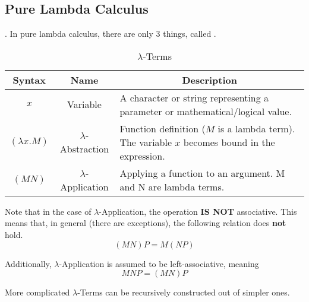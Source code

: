 \subsection{Pure Lambda Calculus}\label{subsec:Pure_Lambda_Calculus}.
In pure lambda calculus, there are only 3 things, called .

\begin{table}[h!tbp]
  \centering
  \begin{tabular}{ccp{15cm}}
    \toprule
    Syntax & Name & \multicolumn{1}{c}{Description} \\
    \midrule
    $x$ & Variable & A character or string representing a parameter or mathematical/logical value. \\
$ (\lambda x. M)$ & $\lambda$-Abstraction & Function definition ($M$ is a lambda term). The variable $x$ becomes bound in the expression. \\
    $(M N)$ & $\lambda$-Application & Applying a function to an argument. M and N are lambda terms. \\
    \bottomrule
  \end{tabular}
\caption{$\lambda$-Terms}
\label{tab:Lambda_Terms}
\end{table}

Note that in the case of $\lambda$-Application, the operation \textbf{IS NOT} associative.
This means that, in general (there are exceptions), the following relation does \textbf{not} hold.
\begin{equation*}
  (MN) P = M(NP)
\end{equation*}

Additionally, $\lambda$-Application is assumed to be left-associative, meaning
\begin{equation*}
  MNP = (MN) P
\end{equation*}

More complicated $\lambda$-Terms can be recursively constructed out of simpler ones.

